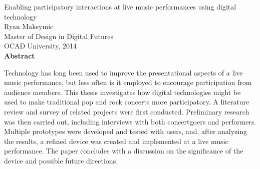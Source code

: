 \begin{center}
{Enabling participatory interactions at live music performances using digital technology\\[0.25cm]
Ryan Maksymic\\[0.25cm]
Master of Design in Digital Futures\\[0.25cm]
OCAD University, 2014\\[0.75cm]
\large\textbf{Abstract}}\\
\end{center}

Technology has long been used to improve the presentational aspects of a live music performance, but less often is it employed to encourage participation from audience members. This thesis investigates how digital technologies might be used to make traditional pop and rock concerts more participatory. A literature review and survey of related projects were first conducted. Preliminary research was then carried out, including interviews with both concertgoers and performers. Multiple prototypes were developed and tested with users, and, after analyzing the results, a refined device was created and implemented at a live music performance. The paper concludes with a discussion on the significance of the device and possible future directions.